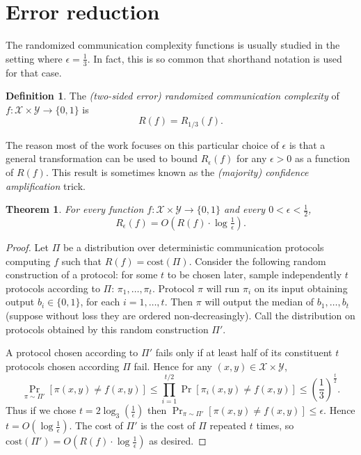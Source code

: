\documentclass[11pt]{amsart}
\theoremstyle{plain}
\newtheorem{theorem}{Theorem}
\theoremstyle{definition}
\newtheorem{definition}{Definition}
\theoremstyle{plain}
\newcommand{\calX}{\mathcal{X}}
\newcommand{\calY}{\mathcal{Y}}
\newcommand{\cost}{\mathrm{cost}}
\begin{document}
\newpage 
\section{Error reduction}

The randomized communication complexity functions is usually studied in the setting where $\epsilon = \frac13$. In fact, this is so common that shorthand notation is used for that case.

\begin{definition}
The \emph{(two-sided error) randomized communication complexity} of $f : \calX \times \calY \to \{0,1\}$ is
\[
R(f) = R_{1/3}(f).
\]
\end{definition}

The reason most of the work focuses on this particular choice of $\epsilon$ is that a general transformation can be used to bound $R_\epsilon(f)$ for any $\epsilon > 0$ as a function of $R(f)$. This result is sometimes known as the \emph{(majority) confidence amplification} trick.

\begin{theorem}
For every function $f : \calX \times \calY \to \{0,1\}$ and every $0 < \epsilon < \frac12$, 
\[
R_\epsilon(f) = O\left( R(f) \cdot \log \tfrac1\epsilon \right).
\]
\end{theorem}

\begin{proof}
Let $\Pi$ be a distribution over deterministic communication protocols computing $f$ such that $R(f) = \cost(\Pi)$. Consider the following random construction of a protocol: for some $t$ to be chosen later, sample independently $t$ protocols according to $\Pi$: $\pi_1,\dots, \pi_t$. Protocol $\pi$ will run $\pi_i$ on its input obtaining output $b_i \in\{0,1\}$, for each $i = 1,\dots, t$. Then $\pi$ will output the median of $b_1, \dots, b_t$ (suppose without loss they are ordered non-decreasingly). Call the distribution on protocols obtained by this random construction $\Pi'$.

A protocol chosen according to $\Pi'$ fails only if at least half of its constituent $t$ protocols chosen according $\Pi$ fail. Hence for any $(x,y) \in \calX\times \calY$,
$$\Pr_{\pi \sim \Pi'}[\pi(x,y)\neq f(x,y)] \leq \prod_{i=1}^{t/2} \Pr[\pi_i(x,y) \neq f(x,y)] \leq (\frac{1}{3})^{\frac{t}{2}}.$$
Thus if we chose $t = 2\log_3(\frac{1}{\epsilon})$ then $\Pr_{\pi \sim \Pi'}[\pi(x,y)\neq f(x,y)] \leq \epsilon$. Hence $t = O(\log\frac{1}{\epsilon})$. The cost of $\Pi'$ is the cost of $\Pi$ repeated $t$ times, so $\cost(\Pi') = O(R(f)\cdot \log\frac{1}{\epsilon})$ as desired.
\end{proof}
\end{document}
